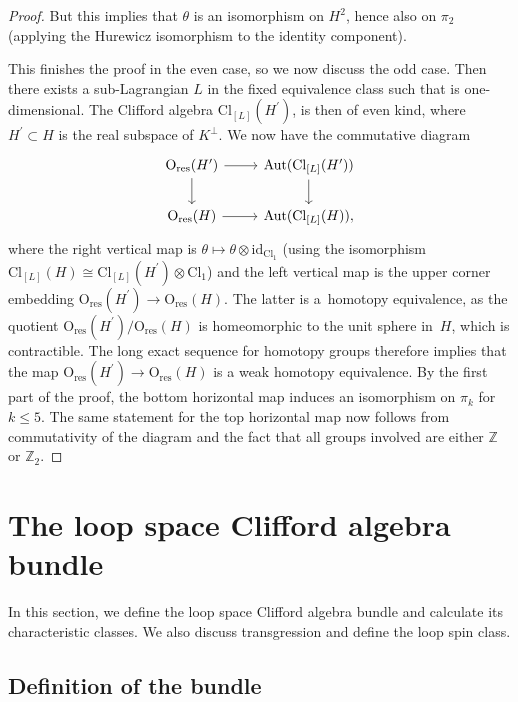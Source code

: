 \documentclass[11pt]{article}
\numberwithin{equation}{section}
\numberwithin{equation}{section}
\newcommand{\Z}{\mathbb{Z}}
\newcommand{\Cl}{\mathrm{Cl}}
\newcommand{\id}{\mathrm{id}}
\newcommand{\res}{\mathrm{res}}
\newcommand{\Aut}{\mathrm{Aut}}
\renewcommand{\O}{\mathrm{O}}
\begin{document}
\begin{proof}
But this implies that $\theta$ is an isomorphism on $H^2$, hence also on $\pi_2$ (applying the Hurewicz isomorphism to the identity component).

This finishes the proof in the even case, so we now discuss the odd case.
Then there exists a sub-Lagrangian $L$ in the fixed equivalence class such that  is one-dimensional.
The Clifford algebra $\Cl_{[L]}(H^\prime)$, is then of even kind, where $H^\prime \subset H$ is the real subspace of $K^\perp$.
We now have the commutative diagram
\begin{equation*}
\begin{tikzcd}
 \O_{\res}(H^\prime) \ar[r] \ar[d]& \Aut(\Cl_{[L]}(H^\prime)) \ar[d]\\
 \O_{\res}(H) \ar[r]& \Aut(\Cl_{[L]}(H)),
\end{tikzcd}
\end{equation*}
where the right vertical map is $\theta \mapsto \theta \otimes \id_{\Cl_1}$ (using the isomorphism $\Cl_{[L]}(H) \cong \Cl_{[L]}(H^\prime) \otimes \Cl_1$) and the left vertical map is the upper corner embedding $\O_{\res}(H^\prime) \to \O_{\res}(H)$.
The latter is a~homotopy equivalence, as the quotient $\O_{\res}(H^\prime) / \O_{\res}(H)$ is homeomorphic to the unit sphere in~$H$, which is contractible.
The long exact sequence for homotopy groups therefore implies that the map $\O_{\res}(H^\prime) \to \O_{\res}(H)$ is a weak homotopy equivalence.
By the first part of the proof, the bottom horizontal map induces an isomorphism on $\pi_k$ for $k \leq 5$.
The same statement for the top horizontal map now follows from commutativity of the diagram and the fact that all groups involved are either $\Z$ or $\Z_2$.
\end{proof}


\section{The loop space Clifford algebra bundle}\label{sec4}

In this section, we define the loop space Clifford algebra bundle and calculate its characteristic classes.
We also discuss transgression and define the loop spin class.

\subsection{Definition of the bundle} \label{SectionLoopSpaceCliffordBundle}
\end{document}
